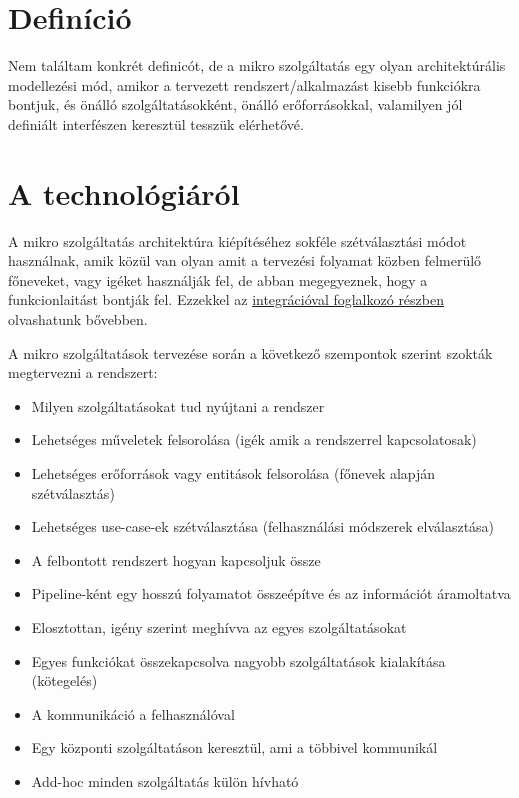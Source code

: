 \documentclass[11pt,magyar,a4paper,oneside,]{report}
\providecommand{\tightlist}{%
  \setlength{\itemsep}{0pt}\setlength{\parskip}{0pt}}
\begin{document}
\section{Definíció}\label{definuxedciuxf3}

Nem találtam konkrét definicót, de a mikro szolgáltatás egy olyan
architektúrális modellezési mód, amikor a tervezett
rendszert/alkalmazást kisebb funkciókra bontjuk, és önálló
szolgáltatásokként, önálló erőforrásokkal, valamilyen jól definiált
interfészen keresztül tesszük elérhetővé.

\section{A technológiáról}\label{a-technoluxf3giuxe1ruxf3l}

A mikro szolgáltatás architektúra kiépítéséhez sokféle szétválasztási
módot használnak, amik közül van olyan amit a tervezési folyamat közben
felmerülő főneveket, vagy igéket használják fel, de abban megegyeznek,
hogy a funkcionlaitást bontják fel. Ezzekkel az
\href{Integrációs-minták}{integrációval foglalkozó részben} olvashatunk
bővebben.

A mikro szolgáltatások tervezése során a következő szempontok szerint
szokták megtervezni a rendszert:

\begin{itemize}
\tightlist
\item
  Milyen szolgáltatásokat tud nyújtani a rendszer
\item
  Lehetséges műveletek felsorolása (igék amik a rendszerrel
  kapcsolatosak)
\item
  Lehetséges erőforrások vagy entitások felsorolása (főnevek alapján
  szétválasztás)
\item
  Lehetséges use-case-ek szétválasztása (felhasználási módszerek
  elválasztása)
\item
  A felbontott rendszert hogyan kapcsoljuk össze
\item
  Pipeline-ként egy hosszú folyamatot összeépítve és az információt
  áramoltatva
\item
  Elosztottan, igény szerint meghívva az egyes szolgáltatásokat
\item
  Egyes funkciókat összekapcsolva nagyobb szolgáltatások kialakítása
  (kötegelés)
\item
  A kommunikáció a felhasználóval
\item
  Egy központi szolgáltatáson keresztül, ami a többivel kommunikál
\item
  Add-hoc minden szolgáltatás külön hívható
\end{itemize}
\end{document}
